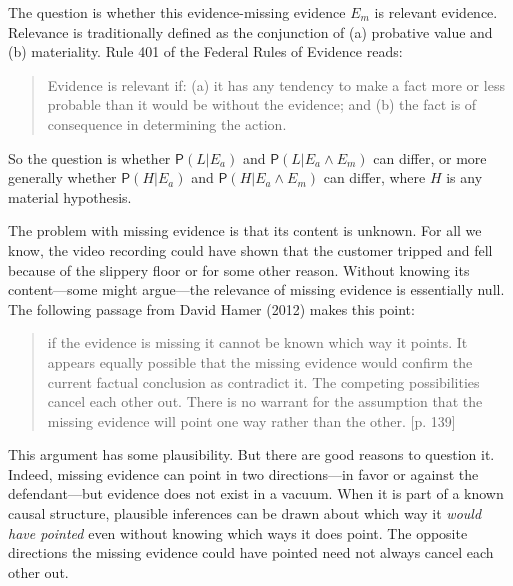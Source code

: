 \documentclass[
  10pt,
  dvipsnames,enabledeprecatedfontcommands]{scrartcl}
\newcommand{\pr}[1]{\mathsf{P}(#1)}
\begin{document}
The question is whether this evidence-missing evidence \(E_m\) is
relevant evidence. Relevance is traditionally defined as the conjunction
of (a) probative value and (b) materiality. Rule 401 of the Federal
Rules of Evidence reads:

\begin{quote}
Evidence is relevant if: (a) it has any tendency to make a fact more or less probable than it would be without the evidence; and (b) the fact is of consequence in determining the action.
\end{quote}

\noindent So the question is whether \(\pr{L \vert E_a}\) and
\(\pr{L \vert E_a \wedge E_m}\) can differ, or more generally whether
\(\pr{H \vert E_a}\) and \(\pr{H \vert E_a \wedge E_m}\) can differ,
where \(H\) is any material hypothesis.

The problem with missing evidence is that its content is unknown. For
all we know, the video recording could have shown that the customer
tripped and fell because of the slippery floor or for some other reason.
Without knowing its content---some might argue---the relevance of
missing evidence is essentially null. The following passage from David
Hamer (2012) makes this point:

\begin{quote}
if the evidence is missing it cannot be known which way it points.
It appears equally possible that the missing evidence would confirm the current factual conclusion as contradict it. The competing possibilities cancel each other out. There is no warrant for the assumption that the missing evidence will point one way rather than the other. [p. 139]
\end{quote}

\noindent This argument has some plausibility. But there are good
reasons to question it. Indeed, missing evidence can point in two
directions---in favor or against the defendant---but evidence does not
exist in a vacuum. When it is part of a known causal structure,
plausible inferences can be drawn about which way it \emph{would have
pointed} even without knowing which ways it does point. The opposite
directions the missing evidence could have pointed need not always
cancel each other out.
\end{document}
